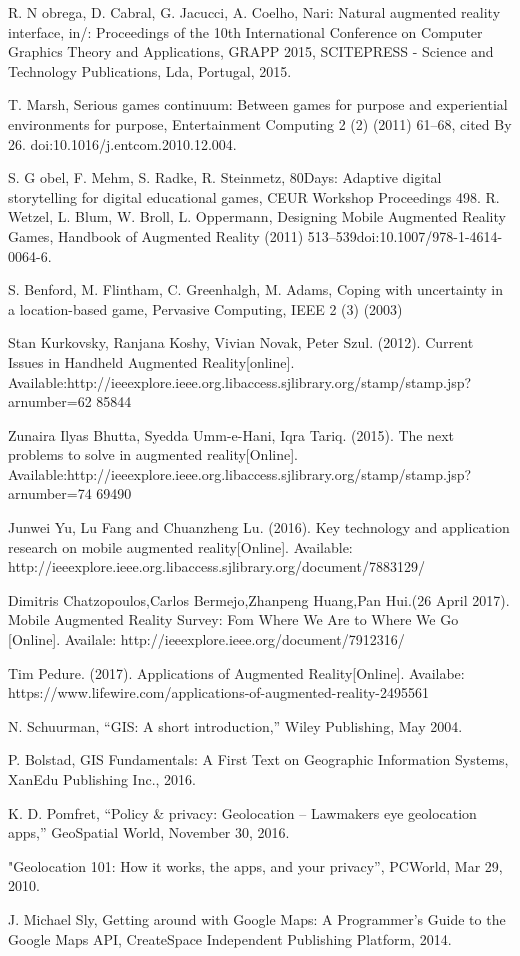 \begin{spacing}{1.5}
\begin{thebibliography}{99}
 R. N obrega, D. Cabral, G. Jacucci, A. Coelho, Nari: Natural augmented reality interface, in/: Proceedings of the 10th International Conference on Computer Graphics Theory and Applications, GRAPP 2015, SCITEPRESS - Science and Technology Publications, Lda, Portugal, 2015. 

T. Marsh, Serious games continuum: Between games for purpose and experiential environments for purpose, Entertainment Computing 2 (2) (2011) 61–68, cited By 26. doi:10.1016/j.entcom.2010.12.004.

  S. G obel, F. Mehm, S. Radke, R. Steinmetz, 80Days: Adaptive digital storytelling for digital educational games, CEUR Workshop Proceedings 498. 
 R. Wetzel, L. Blum, W. Broll, L. Oppermann, Designing Mobile Augmented Reality Games, Handbook of Augmented Reality (2011) 513–539doi:10.1007/978-1-4614-0064-6. 

 S. Benford, M. Flintham, C. Greenhalgh, M. Adams, Coping with uncertainty in a location-based game, Pervasive Computing, IEEE 2 (3) (2003) 

Stan Kurkovsky, Ranjana Koshy, Vivian Novak, Peter Szul. (2012). Current Issues in Handheld Augmented Reality[online]. Available:http://ieeexplore.ieee.org.libaccess.sjlibrary.org/stamp/stamp.jsp?arnumber=62 85844

 Zunaira Ilyas Bhutta, Syedda Umm-e-Hani, Iqra Tariq. (2015). The next problems to solve in augmented reality[Online]. Available:http://ieeexplore.ieee.org.libaccess.sjlibrary.org/stamp/stamp.jsp?arnumber=74 69490 

Junwei Yu, Lu Fang and Chuanzheng Lu. (2016). Key technology and application research on mobile augmented reality[Online]. Available: http://ieeexplore.ieee.org.libaccess.sjlibrary.org/document/7883129/  

Dimitris Chatzopoulos,Carlos Bermejo,Zhanpeng Huang,Pan Hui.(26 April 2017). Mobile Augmented Reality Survey: Fom Where We Are to Where We Go [Online]. Availale: http://ieeexplore.ieee.org/document/7912316/ 

Tim Pedure. (2017). Applications of Augmented Reality[Online]. Availabe: https://www.lifewire.com/applications-of-augmented-reality-2495561 
  
  N. Schuurman, “GIS: A short introduction,” Wiley Publishing, May 2004. 

 P. Bolstad, GIS Fundamentals: A First Text on Geographic Information Systems, XanEdu Publishing Inc., 2016. 

  K. D. Pomfret, ``Policy \& privacy: Geolocation – Lawmakers eye geolocation apps,” GeoSpatial World, November 30, 2016. 

 "Geolocation 101: How it works, the apps, and your privacy”, PCWorld, Mar 29, 2010. 

 J. Michael Sly, Getting around with Google Maps: A Programmer's Guide to the Google Maps API, CreateSpace Independent Publishing Platform, 2014.

 \end{thebibliography}
\end{spacing}
	
\nocite{*}


